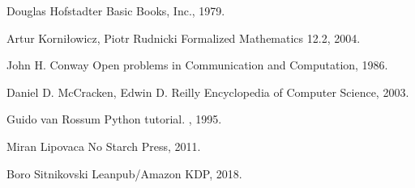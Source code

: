 \documentclass{article}
\begin{document}
\begin{thebibliography}{1}

Douglas Hofstadter
\newblock Basic Books, Inc., 1979.

Artur Korniłowicz, Piotr Rudnicki
\newblock Formalized Mathematics 12.2, 2004.

John H. Conway
\newblock Open problems in Communication and Computation, 1986.

Daniel D. McCracken, Edwin D. Reilly
\newblock Encyclopedia of Computer Science, 2003.

Guido van Rossum
\newblock Python tutorial.
, 1995.

Miran Lipovaca
\newblock No Starch Press, 2011.

Boro Sitnikovski
\newblock Leanpub/Amazon KDP, 2018.

\end{thebibliography}
\end{document}
